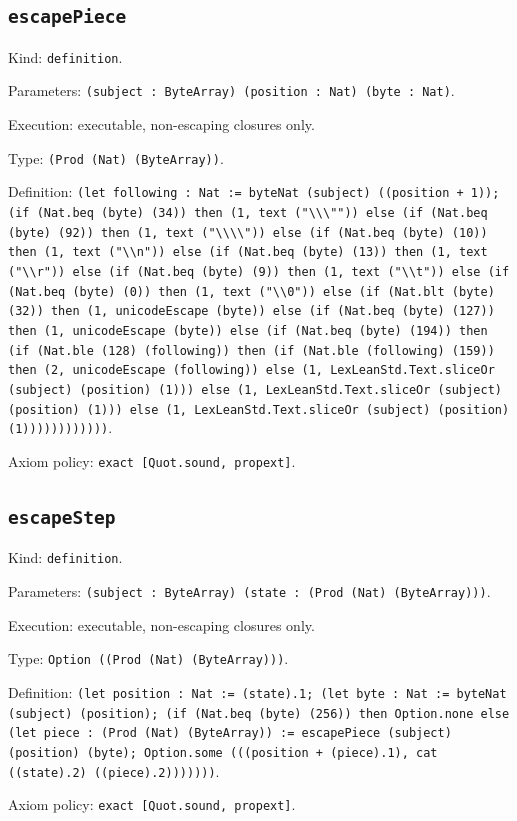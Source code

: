 \documentclass[11pt]{article}
\begin{document}
\subsection*{\texttt{escapePiece}}
\noindent Kind: \texttt{definition}.\par
\noindent Parameters: \texttt{(subject : ByteArray) (position : Nat) (byte : Nat)}.\par
\noindent Execution: executable, non-escaping closures only.\par
\noindent Type: \texttt{(Prod (Nat) (ByteArray))}.\par
\noindent Definition: \texttt{(let following : Nat := byteNat (subject) ((position + 1)); (if (Nat.beq (byte) (34)) then (1, text ("\textbackslash{}\textbackslash{}\textbackslash{}"")) else (if (Nat.beq (byte) (92)) then (1, text ("\textbackslash{}\textbackslash{}\textbackslash{}\textbackslash{}")) else (if (Nat.beq (byte) (10)) then (1, text ("\textbackslash{}\textbackslash{}n")) else (if (Nat.beq (byte) (13)) then (1, text ("\textbackslash{}\textbackslash{}r")) else (if (Nat.beq (byte) (9)) then (1, text ("\textbackslash{}\textbackslash{}t")) else (if (Nat.beq (byte) (0)) then (1, text ("\textbackslash{}\textbackslash{}0")) else (if (Nat.blt (byte) (32)) then (1, unicodeEscape (byte)) else (if (Nat.beq (byte) (127)) then (1, unicodeEscape (byte)) else (if (Nat.beq (byte) (194)) then (if (Nat.ble (128) (following)) then (if (Nat.ble (following) (159)) then (2, unicodeEscape (following)) else (1, LexLeanStd.Text.sliceOr (subject) (position) (1))) else (1, LexLeanStd.Text.sliceOr (subject) (position) (1))) else (1, LexLeanStd.Text.sliceOr (subject) (position) (1))))))))))))}.\par
\noindent Axiom policy: \texttt{exact [Quot.sound, propext]}.\par
\subsection*{\texttt{escapeStep}}
\noindent Kind: \texttt{definition}.\par
\noindent Parameters: \texttt{(subject : ByteArray) (state : (Prod (Nat) (ByteArray)))}.\par
\noindent Execution: executable, non-escaping closures only.\par
\noindent Type: \texttt{Option ((Prod (Nat) (ByteArray)))}.\par
\noindent Definition: \texttt{(let position : Nat := (state).1; (let byte : Nat := byteNat (subject) (position); (if (Nat.beq (byte) (256)) then Option.none else (let piece : (Prod (Nat) (ByteArray)) := escapePiece (subject) (position) (byte); Option.some (((position + (piece).1), cat ((state).2) ((piece).2)))))))}.\par
\noindent Axiom policy: \texttt{exact [Quot.sound, propext]}.\par
\end{document}
